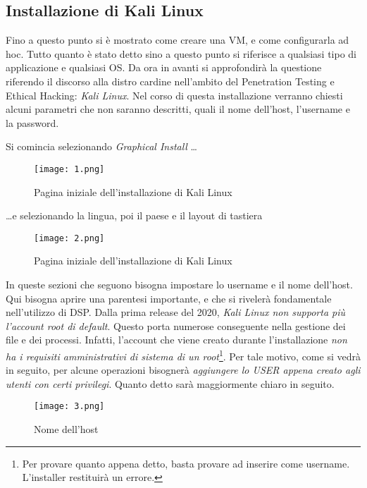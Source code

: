 \documentclass[14pt]{extreport}
\begin{document}
\subsection{Installazione di Kali Linux}
Fino a questo punto si è mostrato come creare una VM, e come configurarla ad hoc. Tutto quanto è stato detto sino a questo punto si riferisce a qualsiasi tipo di applicazione e qualsiasi OS. Da ora in avanti si approfondirà la questione riferendo il discorso alla distro cardine nell'ambito del Penetration Testing e Ethical Hacking: \textit{Kali Linux}.
Nel corso di questa installazione verranno chiesti alcuni parametri che non saranno descritti, quali il nome dell'host, l'username e la password.

Si comincia selezionando \textit{Graphical Install} \ldots

\begin{figure}[H]
    \centering
    \texttt{[image: 1.png]}
    \caption{Pagina iniziale dell'installazione di Kali Linux}
    \label{Kalinsta1}
\end{figure}

\ldots e selezionando la lingua, poi il paese e il layout di tastiera

\begin{figure}[H]
    \centering
    \texttt{[image: 2.png]}
    \caption{Pagina iniziale dell'installazione di Kali Linux}
    \label{Kalinsta2}
\end{figure}

In queste sezioni che seguono bisogna impostare lo username e il nome dell'host. Qui bisogna aprire una parentesi importante, e che si rivelerà fondamentale nell'utilizzo di DSP. Dalla prima release del 2020, \textit{Kali Linux non supporta più l'account root di default}. Questo porta numerose conseguente nella gestione dei file e dei processi. Infatti, l'account che viene creato durante l'installazione \textit{non ha i requisiti amministrativi di sistema di un root}\footnote{Per provare quanto appena detto, basta provare ad inserire  come username. L'installer restituirà un errore.}. Per tale motivo, come si vedrà in seguito, per alcune operazioni bisognerà \textit{aggiungere lo USER appena creato agli utenti con certi privilegi}. Quanto detto sarà maggiormente chiaro in seguito.

\begin{figure}[H]
    \centering
    \texttt{[image: 3.png]}
    \caption{Nome dell'host}
    \label{Kalinsta3}
\end{figure}
\end{document}

